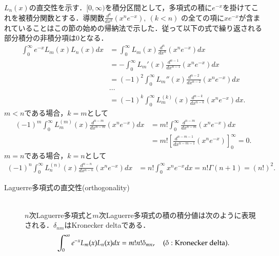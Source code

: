 \documentclass[a4j,papersize,disablejfam,slide,14pt]{jsarticle}
\def\exp#1{e^{#1}} %
\begin{document}
    $L_n(x)$の直交性を示す．$[0, \infty)$を積分区間として，多項式の積に$\exp{-x}$を掛けてこれを被積分関数とする．導関数$\frac{d^k}{dx^k}(x^n \exp{-x}),\ (k<n)$
    の全ての項に$x\exp{-x}$が含まれていることはこの節の始めの帰納法で示した．従って以下の式で繰り返される部分積分の非積分項は$0$となる．
    \begin{align}
    	\int_{0}^{\infty} \exp{-x} L_m(x)L_n(x)dx &= \int_{0}^{\infty} L_m(x)\frac{d^n}{dx^n}(x^n \exp{-x})dx \\
        &= - \int_{0}^{\infty} L_m'(x)\frac{d^{n-1}}{dx^{n-1}}(x^n \exp{-x})dx \\
        &= (-1)^2 \int_{0}^{\infty} L_m''(x)\frac{d^{n-2}}{dx^{n-2}}(x^n \exp{-x})dx \\
        &\cdots \\
        &= (-1)^k \int_{0}^{\infty} L_m^{(k)}(x)\frac{d^{n-k}}{dx^{n-k}}(x^n \exp{-x})dx.
    \end{align}
    $m < n$である場合，$k=m$として
    \begin{align}
    	(-1)^m \int_{0}^{\infty} L_m^{(m)}(x)\frac{d^{n-m}}{dx^{n-m}}(x^n \exp{-x})dx &= m! \int_{0}^{\infty} \frac{d^{n-m}}{dx^{n-m}}(x^n \exp{-x})dx \\
        &= m! \left[ \frac{d^{n-m-1}}{dx^{n-m-1}}(x^n \exp{-x}) \right]_{0}^{\infty} = 0.
    \end{align}
    $m = n$である場合，$k=n$として
    \begin{align}
    	(-1)^n \int_{0}^{\infty} L_n^{(n)}(x)\frac{d^{n-n}}{dx^{n-n}}(x^n \exp{-x})dx &= n! \int_{0}^{\infty} x^n \exp{-x}dx = n! \Gamma(n+1) = (n!)^2.
    \end{align}
    \begin{screen}
    	\begin{description}
        \item[{\rm Laguerre}多項式の直交性({\rm orthogonality})]\mbox{}\\
        	$n$次{\rm Laguerre}多項式と$m$次{\rm Laguerre}多項式の積の積分値は次のように表現される．$\delta_{nm}$は{\rm Kronecker delta}である．
    		\begin{align}
    			\int_{0}^{\infty} \exp{-x} L_m(x)L_n(x)dx = m! n! \delta_{mn}, \quad (\delta: {\rm Kronecker\ delta}).
    		\end{align}
        \end{description}
    \end{screen}
    
\end{document}

